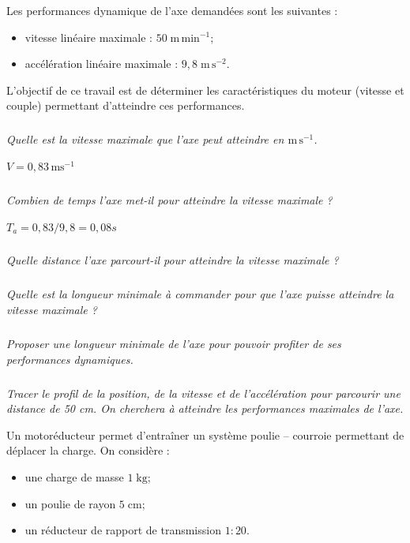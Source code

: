 \documentclass[10pt,fleqn]{article} %
\begin{document}
\begin{multicols}{2}
Les performances dynamique de l'axe demandées sont les suivantes : 
\begin{itemize}
\item vitesse linéaire maximale : $50 \; \text{m}\,\text{min}^{-1}$;
\item accélération linéaire maximale : $9,8 \; \text{m}\, \text{s}^{-2}$.
\end{itemize}

\begin{obj}
L'objectif de ce travail est de déterminer les caractéristiques du moteur (vitesse et couple) permettant d'atteindre ces performances.
\end{obj}

\subparagraph{}
\textit{Quelle est la vitesse maximale que l'axe peut atteindre en  $\text{m}\, \text{s}^{-1}$.}
\ifprof
\begin{corrige}
$V = 0,83 \, \text{ms}^{-1}$
\end{corrige}
\else
\fi

\subparagraph{}
\textit{Combien de temps l'axe met-il pour atteindre la vitesse maximale ?}
\ifprof
\begin{corrige}
$T_a =0,83/9,8 = 0,08 s$
\end{corrige}
\else
\fi

\subparagraph{}
\textit{Quelle distance l'axe parcourt-il pour atteindre la vitesse maximale ?}
\ifprof
\begin{corrige}
\end{corrige}
\else
\fi


\subparagraph{}
\textit{Quelle est la longueur minimale à commander pour que l'axe puisse atteindre la vitesse maximale ?}
\ifprof
\begin{corrige}
\end{corrige}
\else
\fi

\subparagraph{}
\textit{Proposer une longueur minimale de l'axe pour pouvoir profiter de ses performances dynamiques.}
\ifprof
\begin{corrige}
\end{corrige}
\else
\fi


\subparagraph{}
\textit{Tracer le profil de la position, de la vitesse et de l'accélération pour parcourir une distance de 50 cm. On cherchera à atteindre les performances maximales de l'axe. }
\ifprof
\begin{corrige}
\end{corrige}
\else
\fi


Un motoréducteur permet d'entraîner un système poulie -- courroie permettant de déplacer la charge. On considère :
\begin{itemize}
\item une charge de masse $1\; \text{kg}$;
\item un poulie de rayon $5\; \text{cm}$;
\item un réducteur de rapport de transmission $1:20$.
\end{itemize}


\end{multicols}
\end{document}
